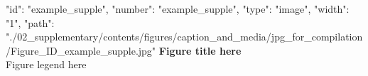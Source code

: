 {
    "id": "example_supple",
    "number": "example_supple",
    "type": "image",
    "width": "1\textwidth",
    "path": "./02_supplementary/contents/figures/caption_and_media/jpg_for_compilation/Figure_ID_example_supple.jpg"
}
\textbf{Figure title here}
\smallskip
\\
Figure legend here
